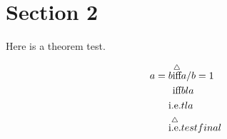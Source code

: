\section{Section 2}
\begin{thm}
    Here is a theorem test.

    \begin{align*}
         a=b \overset{\triangle}{\text{iff}} & a/b = 1\\
         \text{iff} & bla \\
         \text{i.e.} & tla \\
         \overset{\triangle}{\text{i.e.}} & test final 
    \end{align*}
\end{thm}